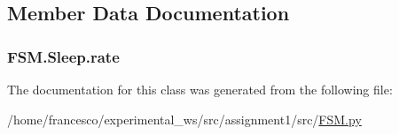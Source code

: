 \subsection{Member Data Documentation}
\subsubsection[{\texorpdfstring{rate}{rate}}]{\setlength{\rightskip}{0pt plus 5cm}F\+S\+M.\+Sleep.\+rate}\hypertarget{classFSM_1_1Sleep_ae09e7c57423ebb912d192c709faa3c01}{}\label{classFSM_1_1Sleep_ae09e7c57423ebb912d192c709faa3c01}


The documentation for this class was generated from the following file\+:\begin{DoxyCompactItemize}
\item 
/home/francesco/experimental\+\_\+ws/src/assignment1/src/\hyperlink{FSM_8py}{F\+S\+M.\+py}\end{DoxyCompactItemize}
